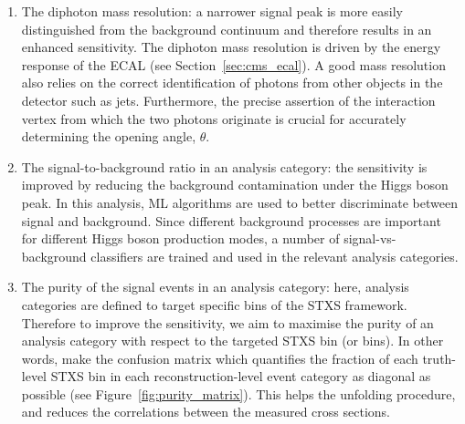 \begin{enumerate}
    \item The diphoton mass resolution: a narrower signal peak is more easily distinguished from the background continuum and therefore results in an enhanced sensitivity. The diphoton mass resolution is driven by the energy response of the ECAL (see Section~\ref{sec:cms_ecal}). A good mass resolution also relies on the correct identification of photons from other objects in the detector such as jets. Furthermore, the precise assertion of the interaction vertex from which the two photons originate is crucial for accurately determining the opening angle, $\theta$.
    
    \item The signal-to-background ratio in an analysis category: the sensitivity is improved by reducing the background contamination under the Higgs boson peak. In this analysis, ML algorithms are used to better discriminate between signal and background. Since different background processes are important for different Higgs boson production modes, a number of signal-vs-background classifiers are trained and used in the relevant analysis categories.
    
    \item The purity of the signal events in an analysis category: here, analysis categories are defined to target specific bins of the STXS framework. Therefore to improve the sensitivity, we aim to maximise the purity of an analysis category with respect to the targeted STXS bin (or bins). In other words, make the confusion matrix which quantifies the fraction of each truth-level STXS bin in each reconstruction-level event category as diagonal as possible (see Figure~\ref{fig:purity_matrix}). This helps the unfolding procedure, and reduces the correlations between the measured cross sections.
\end{enumerate}

